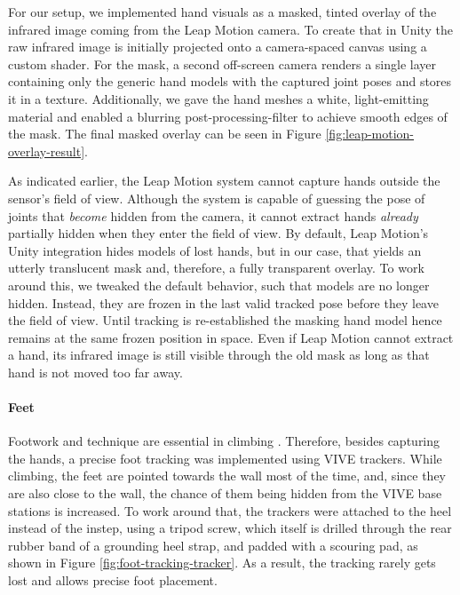 For our setup, we implemented hand visuals as a masked, tinted overlay of the infrared image coming from the Leap Motion camera. To create that in Unity the raw infrared image is initially projected onto a camera-spaced canvas using a custom shader. For the mask, a second off-screen camera renders a single layer containing only the generic hand models with the captured joint poses and stores it in a texture. Additionally, we gave the hand meshes a white, light-emitting material and enabled a blurring post-processing-filter to achieve smooth edges of the mask. The final masked overlay can be seen in Figure \ref{fig:leap-motion-overlay-result}.

As indicated earlier, the Leap Motion system cannot capture hands outside the sensor's field of view. Although the system is capable of guessing the pose of joints that \textit{become} hidden from the camera, it cannot extract hands \textit{already} partially hidden when they enter the field of view. By default, Leap Motion's Unity integration hides models of lost hands, but in our case, that yields an utterly translucent mask and, therefore, a fully transparent overlay. To work around this, we tweaked the default behavior, such that models are no longer hidden. Instead, they are frozen in the last valid tracked pose before they leave the field of view. Until tracking is re-established the masking hand model hence remains at the same frozen position in space. Even if Leap Motion cannot extract a hand, its infrared image is still visible through the old mask as long as that hand is not moved too far away.

 

\paragraph{Feet} Footwork and technique are essential in climbing \autocites{Sheldon2014}[based on][]{Anderson2014}. Therefore, besides capturing the hands, a precise foot tracking was implemented using VIVE trackers. While climbing, the feet are pointed towards the wall most of the time, and, since they are also close to the wall, the chance of them being hidden from the VIVE base stations is increased. To work around that, the trackers were attached to the heel instead of the instep, using a tripod screw, which itself is drilled through the rear rubber band of a grounding heel strap, and padded with a scouring pad, as shown in Figure \ref{fig:foot-tracking-tracker}. As a result, the tracking rarely gets lost and allows precise foot placement.

